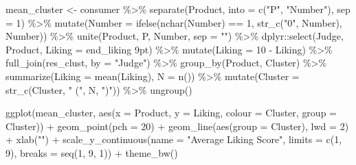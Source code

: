 \documentclass[
]{krantz}
\makeatletter
\newenvironment{Shaded}{\begin{snugshade}}{\end{snugshade}}
\newcommand{\AttributeTok}[1]{\textcolor[rgb]{0.61,0.61,0.61}{#1}}
\newcommand{\DecValTok}[1]{\textcolor[rgb]{0.06,0.06,0.06}{#1}}
\newcommand{\FunctionTok}[1]{\textcolor[rgb]{0,0,0}{#1}}
\newcommand{\NormalTok}[1]{#1}
\newcommand{\OtherTok}[1]{\textcolor[rgb]{0.37,0.37,0.37}{#1}}
\newcommand{\SpecialCharTok}[1]{\textcolor[rgb]{0,0,0}{#1}}
\newcommand{\StringTok}[1]{\textcolor[rgb]{0.5,0.5,0.5}{#1}}
\newenvironment{kframe}{%
\medskip{}
\setlength{\fboxsep}{.8em}
 \def\at@end@of@kframe{}%
 \ifinner\ifhmode%
  \def\at@end@of@kframe{\end{minipage}}%
  \begin{minipage}{\columnwidth}%
 \fi\fi%
 \def\FrameCommand##1{\hskip\@totalleftmargin \hskip-\fboxsep
 \colorbox{shadecolor}{##1}\hskip-\fboxsep
     \hskip-\linewidth \hskip-\@totalleftmargin \hskip\columnwidth}%
 \MakeFramed {\advance\hsize-\width
   \@totalleftmargin\z@ \linewidth\hsize
   \@setminipage}}%
 {\par\unskip\endMakeFramed%
 \at@end@of@kframe}
\renewenvironment{Shaded}{\begin{kframe}}{\end{kframe}}
\makeatother
\begin{document}
\begin{Shaded}
\begin{Highlighting}[]
\NormalTok{mean\_cluster }\OtherTok{\textless{}{-}}\NormalTok{ consumer }\SpecialCharTok{\%\textgreater{}\%}
  \FunctionTok{separate}\NormalTok{(Product, }\AttributeTok{into =} \FunctionTok{c}\NormalTok{(}\StringTok{"P"}\NormalTok{, }\StringTok{"Number"}\NormalTok{), }\AttributeTok{sep =} \DecValTok{1}\NormalTok{) }\SpecialCharTok{\%\textgreater{}\%}
  \FunctionTok{mutate}\NormalTok{(}\AttributeTok{Number =} \FunctionTok{ifelse}\NormalTok{(}\FunctionTok{nchar}\NormalTok{(Number) }\SpecialCharTok{==} \DecValTok{1}\NormalTok{, }
                         \FunctionTok{str\_c}\NormalTok{(}\StringTok{"0"}\NormalTok{, Number), Number)) }\SpecialCharTok{\%\textgreater{}\%}
  \FunctionTok{unite}\NormalTok{(Product, P, Number, }\AttributeTok{sep =} \StringTok{""}\NormalTok{) }\SpecialCharTok{\%\textgreater{}\%}
\NormalTok{  dplyr}\SpecialCharTok{::}\FunctionTok{select}\NormalTok{(Judge, Product, }\AttributeTok{Liking =} \StringTok{\textasciigrave{}}\AttributeTok{end\_liking 9pt}\StringTok{\textasciigrave{}}\NormalTok{) }\SpecialCharTok{\%\textgreater{}\%}
  \FunctionTok{mutate}\NormalTok{(}\AttributeTok{Liking =} \DecValTok{10} \SpecialCharTok{{-}}\NormalTok{ Liking) }\SpecialCharTok{\%\textgreater{}\%}
  \FunctionTok{full\_join}\NormalTok{(res\_clust, }\AttributeTok{by =} \StringTok{"Judge"}\NormalTok{) }\SpecialCharTok{\%\textgreater{}\%}
  \FunctionTok{group\_by}\NormalTok{(Product, Cluster) }\SpecialCharTok{\%\textgreater{}\%}
  \FunctionTok{summarize}\NormalTok{(}\AttributeTok{Liking =} \FunctionTok{mean}\NormalTok{(Liking), }\AttributeTok{N =} \FunctionTok{n}\NormalTok{()) }\SpecialCharTok{\%\textgreater{}\%}
  \FunctionTok{mutate}\NormalTok{(}\AttributeTok{Cluster =} \FunctionTok{str\_c}\NormalTok{(Cluster, }\StringTok{" ("}\NormalTok{, N, }\StringTok{")"}\NormalTok{)) }\SpecialCharTok{\%\textgreater{}\%}
  \FunctionTok{ungroup}\NormalTok{()}

\FunctionTok{ggplot}\NormalTok{(mean\_cluster, }\FunctionTok{aes}\NormalTok{(}\AttributeTok{x =}\NormalTok{ Product, }\AttributeTok{y =}\NormalTok{ Liking, }
                         \AttributeTok{colour =}\NormalTok{ Cluster, }\AttributeTok{group =}\NormalTok{ Cluster)) }\SpecialCharTok{+}
  \FunctionTok{geom\_point}\NormalTok{(}\AttributeTok{pch =} \DecValTok{20}\NormalTok{) }\SpecialCharTok{+}
  \FunctionTok{geom\_line}\NormalTok{(}\FunctionTok{aes}\NormalTok{(}\AttributeTok{group =}\NormalTok{ Cluster), }\AttributeTok{lwd =} \DecValTok{2}\NormalTok{) }\SpecialCharTok{+}
  \FunctionTok{xlab}\NormalTok{(}\StringTok{""}\NormalTok{) }\SpecialCharTok{+}
  \FunctionTok{scale\_y\_continuous}\NormalTok{(}\AttributeTok{name =} \StringTok{"Average Liking Score"}\NormalTok{, }
                     \AttributeTok{limits =} \FunctionTok{c}\NormalTok{(}\DecValTok{1}\NormalTok{, }\DecValTok{9}\NormalTok{), }\AttributeTok{breaks =} \FunctionTok{seq}\NormalTok{(}\DecValTok{1}\NormalTok{, }\DecValTok{9}\NormalTok{, }\DecValTok{1}\NormalTok{)) }\SpecialCharTok{+}
  \FunctionTok{theme\_bw}\NormalTok{()}
\end{Highlighting}
\end{Shaded}
\end{document}
